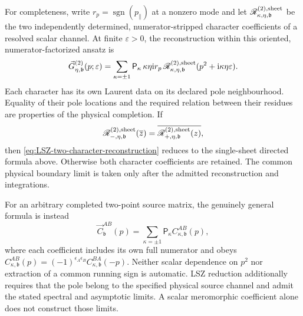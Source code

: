 \documentclass[final,5p,times,twocolumn,numbers,nopreprintline]{elsarticle}
\numberwithin{equation}{section}
\theoremstyle{definition}
\theoremstyle{remark}
\newcommand{\ii}{\mathrm i}
\newcommand{\bb}{\mathfrak b}
\newcommand{\sgn}{\operatorname{sgn}}
\begin{document}
For completeness, write \(r_p=\sgn(p_\parallel)\) at a
nonzero mode and let
\(\mathscr R^{(2),\rm sheet}_{\kappa,\eta,\bb}\) be the
two independently determined, numerator-stripped character
coefficients of a resolved scalar channel. At finite
\(\varepsilon>0\), the reconstruction within this oriented,
numerator-factorized ansatz is
\begin{equation}
 \vec G^{(2)}_{\eta,\bb}(p;\varepsilon)
  =\sum_{\kappa=\pm1}\mathsf P_\kappa\,
     \kappa\eta\ii r_p\,
     \mathscr R^{(2),\rm sheet}_{\kappa,\eta,\bb}
                       (p^2+\ii\kappa\eta\varepsilon).
 \label{eq:LSZ-two-character-reconstruction}
\end{equation}
Each character has its own Laurent data on its declared pole
neighbourhood. Equality of their pole locations and the required
relation between their residues are properties of the physical
completion. If
\begin{equation}
 \mathscr R^{(2),\rm sheet}_{-,\eta,\bb}(\overline z)
   =\overline{
      \mathscr R^{(2),\rm sheet}_{+,\eta,\bb}(z)},
 \label{eq:LSZ-character-reflection}
\end{equation}
then \eqref{eq:LSZ-two-character-reconstruction} reduces to the
single-sheet directed formula above. Otherwise both character
coefficients are retained. The common physical boundary limit is
taken only after the admitted reconstruction and integrations.

For an arbitrary completed two-point source matrix, the genuinely
general formula is instead
\begin{equation}
 \vec C^{AB}_{\bb}(p)
   =\sum_{\kappa=\pm1}\mathsf P_\kappa C^{AB}_{\kappa,\bb}(p),
 \label{eq:LSZ-general-source-matrix}
\end{equation}
where each coefficient includes its own full numerator and obeys
\(C^{AB}_{\kappa,\bb}(p)
=(-1)^{\epsilon_A\epsilon_B}C^{BA}_{\kappa,\bb}(-p)\).
Neither scalar dependence on \(p^2\) nor extraction of a common
running sign is automatic. LSZ reduction additionally requires that
the pole belong to the specified physical source channel and admit
the stated spectral and asymptotic limits. A scalar meromorphic
coefficient alone does not construct those limits.
\end{document}
